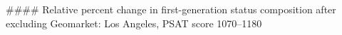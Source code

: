 #### Relative percent change in first-generation status composition after excluding Geomarket: Los Angeles, PSAT score 1070–1180
